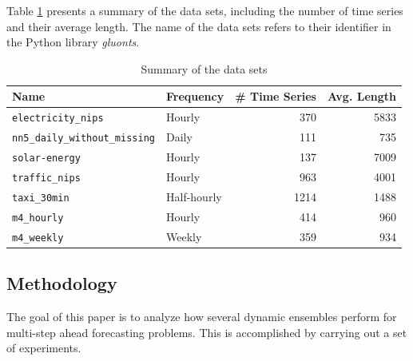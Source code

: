 \documentclass[smallcondensed]{svjour3}
\begin{document}
Table \ref{tab:datasets} presents a summary of the data sets, including the number of time series and their average length. The name of the data sets refers to their identifier in the Python library \textit{gluonts}.

\begin{table}[!bth]
	\centering
	\caption{Summary of the data sets}		
	\begin{tabular}{llrr}
	\toprule
	\textbf{Name} & \textbf{Frequency} & \textbf{\# Time Series} & \textbf{Avg. Length}\\
	    \midrule
        
        \texttt{electricity\_nips} & Hourly & 370 & 5833 \\
        
        \midrule  
        
        \texttt{nn5\_daily\_without\_missing} & Daily & 111 & 735 \\
        
        \midrule  
        
        \texttt{solar-energy} & Hourly & 137 & 7009 \\
        
        \midrule  
        
        \texttt{traffic\_nips} & Hourly & 963 & 4001 \\
        
        \midrule  
        
        
        \texttt{taxi\_30min} & Half-hourly & 1214 & 1488 \\
        
        \midrule
        
        \texttt{m4\_hourly} & Hourly & 414 & 960 \\
        
        \midrule
        
        \texttt{m4\_weekly} & Weekly & 359 & 934 \\
        
		\bottomrule    
	\end{tabular}%
	\label{tab:datasets}
\end{table}

\subsection{Methodology}\label{sec:methodology}

The goal of this paper is to analyze how several dynamic ensembles perform for multi-step ahead forecasting problems. This is accomplished by carrying out a set of experiments.
\end{document}
